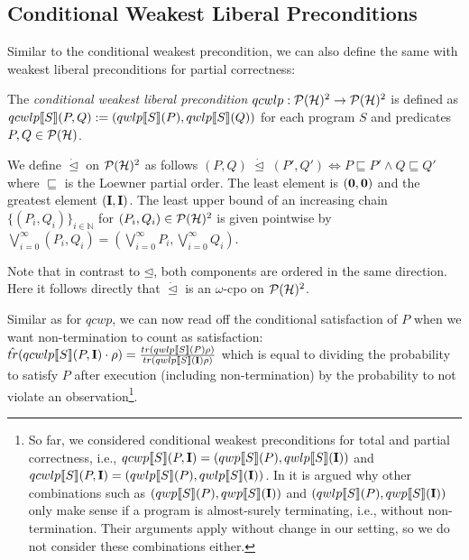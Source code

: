 \documentclass[a4paper,UKenglish,cleveref, autoref, thm-restate]{lipics-v2021}
\begin{document}
\subsection{Conditional Weakest Liberal Preconditions}
Similar to the conditional weakest precondition, we can also define the same with weakest liberal preconditions for partial correctness:
\begin{definition}
    The \emph{conditional weakest liberal precondition} $qcwlp:\mathcal{P}(\mathcal{H})^2\to \mathcal{P}(\mathcal{H})^2$ is defined as $qcwlp\llbracket S \rrbracket (P,Q):= (qwlp\llbracket S \rrbracket (P), qwlp\llbracket S \rrbracket (Q))$ for each program $S$ and predicates $P,Q \in \mathcal{P}(\mathcal{H})$.
\end{definition}
\begin{definition} We define $\dot \unlhd$ on $\mathcal{P}(\mathcal{H})^2$ as follows $
        (P,Q) \phantom{.}\dot \unlhd \phantom{.} (P',Q') \Leftrightarrow P \sqsubseteq P' \land Q \sqsubseteq Q'$
    where $\sqsubseteq$ is the Loewner partial order. The least element is $(\mathbf{0},\mathbf{0})$ and the greatest element $(\textbf{I},\textbf{I})$.
    The least upper bound of an increasing chain $\{(P_i,Q_i)\}_{i\in \mathbb{N}}$ for $(P_i,Q_i)\in \mathcal{P}(\mathcal{H})^2$ is given pointwise by $
        \bigvee_{i=0}^\infty (P_i,Q_i) = (\bigvee_{i=0}^\infty P_i ,\bigvee_{i=0}^\infty Q_i)$.
\end{definition}
Note that in contrast to $\unlhd$, both components are ordered in the same direction. Here it follows directly that $\dot \unlhd$ is an $\omega$-cpo on $\mathcal{P}(\mathcal{H})^2$.

Similar as for $qcwp$, we can now read off the conditional satisfaction of $P$ when we want non-termination to count as satisfaction:
$\hat{tr}(qcwlp\llbracket S \rrbracket (P,\textbf{I})\cdot \rho) = \frac{tr(qwlp\llbracket S \rrbracket (P) \rho)}{tr(qwlp\llbracket S \rrbracket (\textbf{I})\rho)}$ which is equal to dividing the probability to satisfy $P$ after execution (including non-termination) by the probability to not violate an observation\footnote[1]{So far, we considered conditional weakest preconditions for total and partial correctness, i.e., $qcwp\llbracket S \rrbracket (P,\textbf{I}) = (qwp\llbracket S \rrbracket (P), qwlp\llbracket S \rrbracket (\textbf{I}))$ and $qcwlp\llbracket S \rrbracket (P,\textbf{I}) = (qwlp\llbracket S \rrbracket (P), qwlp\llbracket S \rrbracket (\textbf{I}))$.
In \cite[Sect. 8.3]{benniDiss} it is argued why other combinations such as $(qwp\llbracket S \rrbracket (P),qwp\llbracket S \rrbracket (\textbf{I}))$ and $(qwlp\llbracket S \rrbracket (P),qwp\llbracket S \rrbracket (\textbf{I}))$ only make sense if a program is almost-surely terminating, i.e., without non-termination. Their arguments apply without change in our setting, so we do not consider these combinations either.}.
\end{document}
